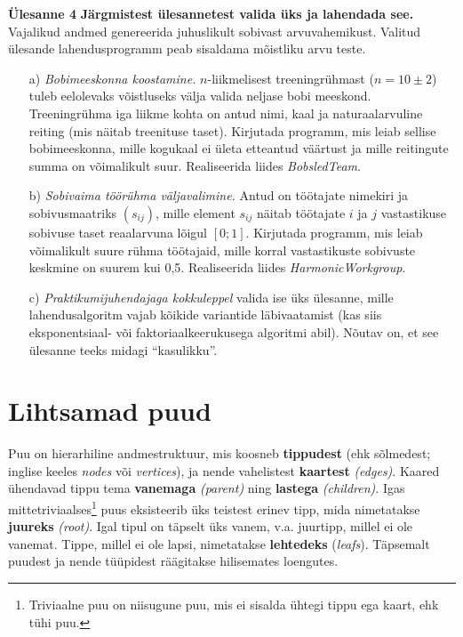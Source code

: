 \documentclass[a4paper]{article}
\begin{document}
\begin{problem}
\textbf{Ülesanne 4}
\newline
\textbf{Järgmistest ülesannetest valida üks ja lahendada see.} Vajalikud andmed genereerida juhuslikult sobivast
arvuvahemikust. Valitud ülesande lahendusprogramm peab sisaldama mõistliku arvu teste.

\begin{enumerate}
\item[a)] {\em Bobimeeskonna koostamine.} $n$-liikmelisest
treeningrühmast ($n=10 \pm 2$) tuleb eelolevaks võistluseks välja valida
neljase bobi meeskond. Treeningrühma iga liikme kohta on antud nimi,
kaal ja naturaalarvuline reiting (mis näitab treenituse taset).
Kirjutada programm, mis leiab sellise bobimeeskonna, mille kogukaal ei
ületa etteantud väärtust ja mille reitingute summa on võimalikult suur.
Realiseerida liides \textit{BobsledTeam}.

 \item[b)] {\em Sobivaima töörühma väljavalimine.} Antud on töötajate
nimekiri ja sobivusmaatriks $(s_{ij})$, mille element $s_{ij}$ näitab töötajate
$i$ ja $j$ vastastikuse sobivuse taset reaalarvuna lõigul $[0;1]$.
Kirjutada programm, mis leiab võimalikult suure rühma töötajaid, mille
korral vastastikuste sobivuste keskmine on suurem kui 0{,}5.
Realiseerida liides \textit{HarmonicWorkgroup}.

 \item[c) ] {\em Praktikumijuhendajaga kokkuleppel} valida ise üks
ülesanne, mille lahendusalgoritm vajab kõikide variantide läbivaatamist
(kas siis eks\-po\-nent\-siaal- või faktoriaalkeerukusega algoritmi abil).
Nõutav on, et see ülesanne teeks midagi "`kasulikku"'.
\end{enumerate}
\end{problem}

\section*{Lihtsamad puud}

Puu on hierarhiline andmestruktuur, mis koosneb \textbf{tippudest} (ehk sõlmedest; inglise keeles \emph{nodes} või \emph{vertices}), ja nende vahelistest \textbf{kaartest} \emph{(edges)}. Kaared ühendavad tippu tema \textbf{vanemaga} \emph{(parent)} ning \textbf{lastega} \emph{(children)}. Igas mittetriviaalses\footnote{Triviaalne puu on niisugune puu, mis ei sisalda ühtegi tippu ega kaart, ehk tühi puu.} puus eksisteerib üks teistest erinev tipp, mida nimetatakse \textbf{juureks} \emph{(root)}. Igal tipul on täpselt üks vanem, v.a. juurtipp, millel ei ole vanemat. Tippe, millel ei ole lapsi, nimetatakse \textbf{lehtedeks} (\emph{leafs}). Täpsemalt puudest ja nende tüüpidest räägitakse hilisemates loengutes.
\end{document}
